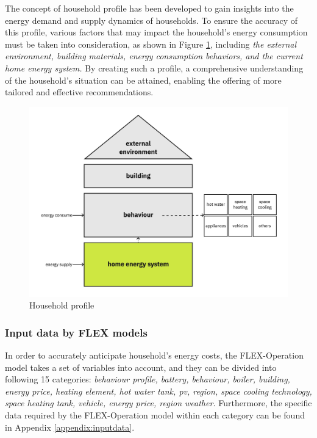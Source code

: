 The concept of household profile has been developed to gain insights into the energy demand and supply dynamics of households. 
To ensure the accuracy of this profile, various factors that may impact the household's energy consumption must be taken into consideration, as shown in Figure \ref{fig:profile}, including 
\emph{
    the external environment, 
    building materials, 
    energy consumption behaviors, 
    and the current home energy system. 
}
By creating such a profile, a comprehensive understanding of the household's situation can be attained, enabling the offering of more tailored and effective recommendations.
\begin{figure}[h]
    \centering
    \includegraphics[width=\textwidth]{Images/household_profile.jpg}
    \caption{Household profile}
    \label{fig:profile}
  \end{figure}

\subsubsection{Input data by FLEX models}

In order to accurately anticipate household's energy costs,
the FLEX-Operation model takes a set of variables into account,
and they can be divided into following 15 categories: 
\emph{
    behaviour profile,
    battery,
    behaviour, 
    boiler,
    building,
    energy price,
    heating element, 
    hot water tank,
    \gls{pv},
    region,
    space cooling technology,
    space heating tank,
    vehicle,
    energy price,
    region weather. 
}
Furthermore, the specific data required by the FLEX-Operation model within each category can be found in Appendix \ref{appendix:inputdata}. 



